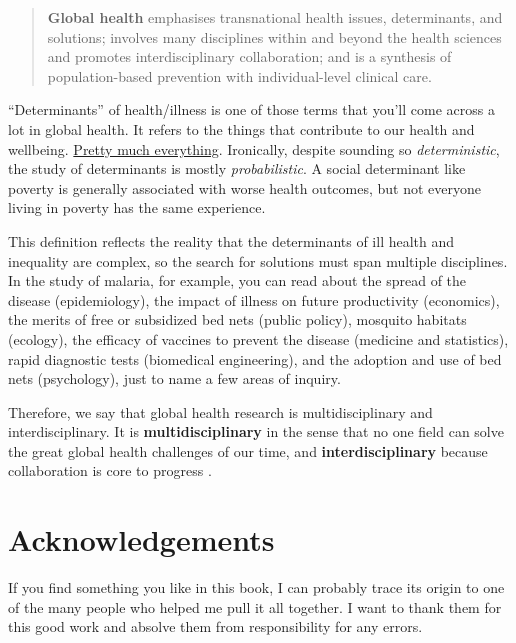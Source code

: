 \documentclass[justified,twoside,symmetric,]{tufte-book}
\renewcommand*{\citep}[1]{{\cite{#1}}}
\begin{document}
\begin{quote}
\textbf{Global health} emphasises transnational health issues, determinants, and solutions; involves many disciplines within and beyond the health sciences and promotes interdisciplinary collaboration; and is a synthesis of population-based prevention with individual-level clinical care.
\end{quote}

\begin{marginfigure}
``Determinants'' of health/illness is one of those terms that you'll
come across a lot in global health. It refers to the things that
contribute to our health and wellbeing.
\href{http://tinyurl.com/zvdxezv}{Pretty much everything}. Ironically,
despite sounding so \emph{deterministic}, the study of determinants is
mostly \emph{probabilistic}. A social determinant like poverty is
generally associated with worse health outcomes, but not everyone living
in poverty has the same experience.
\end{marginfigure}

This definition reflects the reality that the determinants of ill health and inequality are complex, so the search for solutions must span multiple disciplines. In the study of malaria, for example, you can read about the spread of the disease (epidemiology), the impact of illness on future productivity (economics), the merits of free or subsidized bed nets (public policy), mosquito habitats (ecology), the efficacy of vaccines to prevent the disease (medicine and statistics), rapid diagnostic tests (biomedical engineering), and the adoption and use of bed nets (psychology), just to name a few areas of inquiry.

Therefore, we say that global health research is multidisciplinary and interdisciplinary. It is \textbf{multidisciplinary} in the sense that no one field can solve the great global health challenges of our time, and \textbf{interdisciplinary} because collaboration is core to progress \citep{merson:2011}.

\hypertarget{acknowledgements}{%
\chapter*{Acknowledgements}\label{acknowledgements}}

If you find something you like in this book, I can probably trace its origin to one of the many people who helped me pull it all together. I want to thank them for this good work and absolve them from responsibility for any errors.
\end{document}
